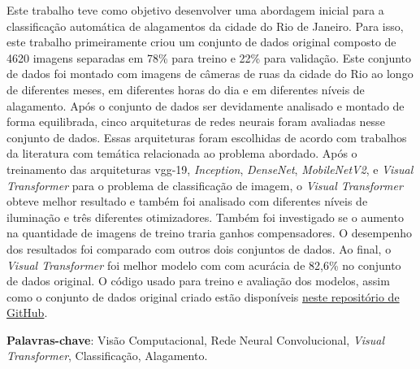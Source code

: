 \begin{resumo}


Este trabalho teve como objetivo desenvolver uma abordagem inicial para a classificação automática de alagamentos da cidade do Rio de Janeiro.
Para isso, este trabalho primeiramente criou um conjunto de dados original composto de 4620 imagens separadas em 78\% para treino e 22\% para validação.
Este conjunto de dados foi montado com imagens de câmeras de ruas da cidade do Rio ao longo de diferentes meses, em diferentes horas do dia e em diferentes níveis de alagamento.
Após o conjunto de dados ser devidamente analisado e montado de forma equilibrada, cinco arquiteturas de redes neurais foram avaliadas nesse conjunto de dados. 
Essas arquiteturas foram escolhidas de acordo com trabalhos da literatura com temática relacionada ao problema abordado.
Após o treinamento das arquiteturas \acrshort{vgg}-19, \textit{Inception}, \textit{DenseNet}, \textit{MobileNetV2}, e \textit{Visual Transformer} para o problema de classificação de imagem, 
o \textit{Visual Transformer} obteve melhor resultado e também foi analisado com diferentes níveis de iluminação e três diferentes otimizadores.
Também foi investigado se o aumento na quantidade de imagens de treino traria ganhos compensadores. 
O desempenho dos resultados foi comparado com outros dois conjuntos de dados.
Ao final, o \textit{Visual Transformer} foi melhor modelo com com acurácia de 82,6\% no conjunto de dados original.
O código usado para treino e avaliação dos modelos, assim como o conjunto de dados original criado estão disponíveis \href{https://github.com/afego/computervision}{neste repositório de GitHub}.

{\hspace{-8mm} \bf{Palavras-chave}}: Visão Computacional, Rede Neural Convolucional, \textit{Visual Transformer}, Classificação, Alagamento.

\end{resumo}

